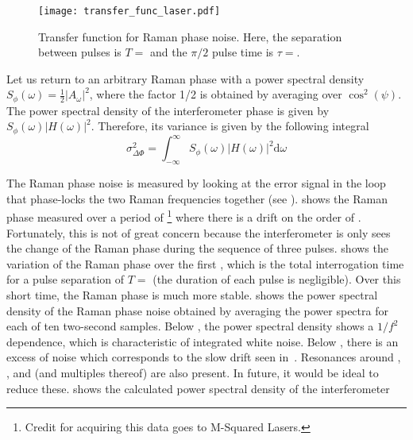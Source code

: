 \begin{figure}[htpb!]
  \centering
  \texttt{[image: transfer\_func\_laser.pdf]}
  \caption[Transfer function for Raman phase noise.]{Transfer function
  for Raman phase noise. Here, the separation between pulses is \(T =
  \) and the \(\pi/2\) pulse time is \(\tau
=\).}
  \label{fig:transfer_function}
\end{figure}
\par\noindent
Let us return to an arbitrary Raman phase with a power spectral density
$S_\phi(\omega) = \frac{1}{2}|A_\omega|^2$, where the factor 1/2 is
obtained by averaging over $\cos^2(\psi)$. The power spectral density of the interferometer
phase is given by $S_\phi(\omega) |H(\omega)|^2$. Therefore, its
variance is given by the following integral
\begin{equation}
  \sigma_{\Delta\Phi}^2 = \int_{-\infty}^\infty
    S_\phi(\omega)|H(\omega)|^2 \mathrm{d}\omega 
  \end{equation}
 \par\noindent
The Raman phase noise is measured by looking at the error signal in
the loop that
phase-locks the two Raman frequencies together (see
). 
shows the Raman phase measured over a period of
\footnote{Credit for
acquiring this data goes to M-Squared Lasers.} where there is a drift
on the order of . 
Fortunately, this is not of great concern because the interferometer
is only sees the change of the Raman phase during the sequence of
three pulses.  shows the
variation of the Raman phase over the first , which
is the total interrogation time for a pulse separation of $T = $
 (the duration of each pulse is
negligible). Over this short time, the Raman phase
is much more stable.  shows the power
spectral density of the Raman phase noise obtained by averaging the
power spectra for each of ten two-second samples. Below , the
power spectral density shows a $1/f^2$ dependence, which is
characteristic of integrated white noise. Below ,
there is an excess of noise which corresponds to the slow drift seen
in~. Resonances around
, ,  and
 (and multiples thereof) are also present. In
future, it would be ideal to reduce these.
 shows the calculated power spectral density of the interferometer
